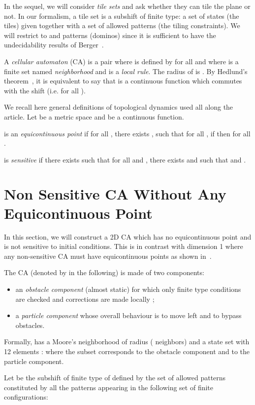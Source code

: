 \documentclass{llncs}
\begin{document}
In the sequel, we will consider \emph{tile sets} and ask whether they
can tile the plane or not. In our formalism, a tile set is a subshift
of finite type: a set of states (the tiles) given together with a set
of allowed patterns (the tiling constraints). We will restrict to
 and  patterns (dominos) since it is sufficient
to have the undecidability results of Berger~\cite{berger}.

A {\em cellular automaton} (CA) is a pair  where
 is defined by  for all
 and  where  is a finite set named {\em
  neighborhood} and  is a {\em local
  rule}. The radius of  is . By
Hedlund's theorem~\cite{hedlund}, it is equivalent to say that  is
a continuous function which commutes with the shift (i.e.  for all ).

We recall here general definitions of topological dynamics used all
along the article. Let  be a metric space and  be a
continuous function.


  is an {\em equicontinuous point} if for all ,
there exists , such that for all , if  then
 for all .

  is {\em sensitive} if there exists  such that
for all  and , there exists  and  such
that  and . 

\section{Non Sensitive CA Without Any Equicontinuous Point}
\label{sec:sensitivity}

In this section, we will construct a 2D CA which has no equicontinuous
point and is not sensitive to initial conditions. This is in contrast
with dimension 1 where any non-sensitive CA must have equicontinuous
points as shown in~\cite{Kurka97}.

The CA (denoted by  in the following) is made of two components:
\begin{itemize}
\item an \emph{obstacle component} (almost static) for which only
  finite type conditions are checked and corrections are made locally
  ;
\item a \emph{particle component} whose overall behaviour is to move
  left and to bypass obstacles.
\end{itemize}

Formally,  has a Moore's neighborhood of radius  (
neighbors) and a state set  with 12 elements :
 where
the subset 
corresponds to the obstacle component and  to the particle
component.

Let  be the subshift of finite type of  defined by the
set of allowed patterns constituted by all the  patterns
appearing in the following set of finite configurations:
\end{document}
